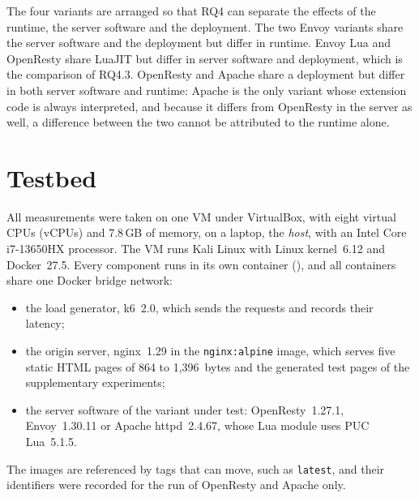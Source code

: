 \documentclass{rptuma}
\begin{document}
The four variants are arranged so that RQ4 can separate the effects of the runtime, the server software
and the deployment. The two Envoy
variants share the server software and the deployment but differ in runtime. Envoy Lua and OpenResty share LuaJIT but differ in server software and deployment, which is the comparison of RQ4.3.
OpenResty and Apache share a deployment but differ in both server software and runtime: Apache
is the only variant whose extension code is always interpreted, and because it differs
from OpenResty in the server as well, a difference between the two cannot be attributed
to the runtime alone.

\section{Testbed}
\label{sec:method.testbed}

All measurements were taken on one VM under VirtualBox, with eight virtual CPUs
(vCPUs) and 7.8\,GB of memory, on a laptop, the \emph{host}, with an Intel Core i7-13650HX processor. The VM runs
Kali Linux with Linux kernel~6.12 and Docker~27.5. Every component runs in its own container
(), and all containers share one Docker bridge network:
\begin{itemize}
  \item the load generator, k6~2.0, which sends the requests and records their latency;
  \item the origin server, nginx~1.29 in the \texttt{nginx:alpine} image, which serves five static
    HTML pages of 864 to 1,396~bytes and the generated test pages of the supplementary experiments;
  \item the server software of the variant under test: OpenResty~1.27.1, Envoy~1.30.11 or Apache
    httpd~2.4.67, whose Lua module uses PUC Lua~5.1.5.
\end{itemize}
The images are referenced by tags that can move, such as \texttt{latest}, and their identifiers
were recorded for the run of OpenResty and Apache only.
\end{document}

